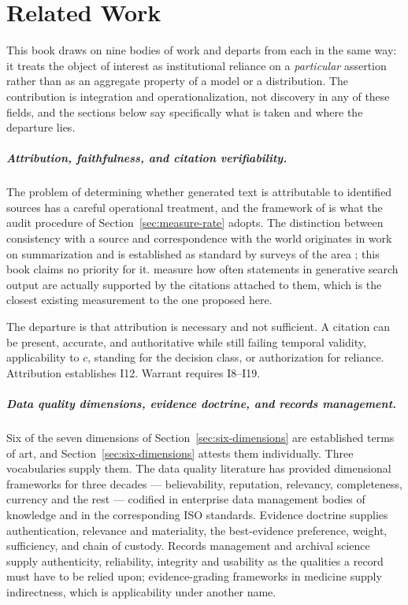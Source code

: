 \chapter{Related Work}
\label{ch:related-work}
\label{sec:related}

This book draws on nine bodies of work and departs from each in the same way: it
treats the object of interest as institutional reliance on a \emph{particular}
assertion rather than as an aggregate property of a model or a distribution. The
contribution is integration and operationalization, not discovery in any of these
fields, and the sections below say specifically what is taken and where the departure
lies.

\paragraph{Attribution, faithfulness, and citation verifiability.} The problem of
determining whether generated text is attributable to identified sources has a
careful operational treatment, and the framework of \citet{rashkin2023} is what the
audit procedure of Section~\ref{sec:measure-rate} adopts. The distinction between
consistency with a source and correspondence with the world originates in work on
summarization \citep{maynez2020} and is established as standard by surveys of the area
\citep{ji2023}; this book claims no priority for it. \citet{liu2023} measure how
often statements in generative search output are actually supported by the citations
attached to them, which is the closest existing measurement to the one proposed here.

The departure is that attribution is necessary and not sufficient. A citation can be
present, accurate, and authoritative while still failing temporal validity,
applicability to $c$, standing for the decision class, or authorization for reliance.
Attribution establishes I12. Warrant requires I8--I19.

\paragraph{Data quality dimensions, evidence doctrine, and records management.}
Six of the seven dimensions of Section~\ref{sec:six-dimensions} are established
terms of art, and Section~\ref{sec:six-dimensions} attests them individually. Three
vocabularies supply them. The data quality literature has provided dimensional
frameworks for three decades --- believability, reputation, relevancy,
completeness, currency and the rest --- codified in enterprise data management
bodies of knowledge and in the corresponding ISO standards. Evidence doctrine
supplies authentication, relevance and materiality, the best-evidence preference,
weight, sufficiency, and chain of custody. Records management and archival science
supply authenticity, reliability, integrity and usability as the qualities a record
must have to be relied upon; evidence-grading frameworks in medicine supply
indirectness, which is applicability under another name.

